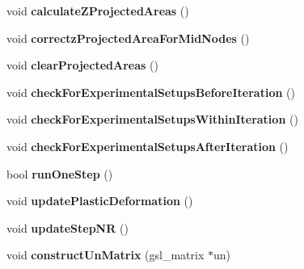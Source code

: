 \begin{DoxyCompactItemize}
\item 
\hypertarget{classSimulation_af21c5c157e6f487f879bdd7043288982}{}void {\bfseries calculate\+Z\+Projected\+Areas} ()\label{classSimulation_af21c5c157e6f487f879bdd7043288982}

\item 
\hypertarget{classSimulation_a7a47dfca0623a5636cb65416411cb901}{}void {\bfseries correctz\+Projected\+Area\+For\+Mid\+Nodes} ()\label{classSimulation_a7a47dfca0623a5636cb65416411cb901}

\item 
\hypertarget{classSimulation_a9c3f5acaa8ec130dedc94dfd6f7b013a}{}void {\bfseries clear\+Projected\+Areas} ()\label{classSimulation_a9c3f5acaa8ec130dedc94dfd6f7b013a}

\item 
\hypertarget{classSimulation_aa9ad0627365ad5d465b273183c7db344}{}void {\bfseries check\+For\+Experimental\+Setups\+Before\+Iteration} ()\label{classSimulation_aa9ad0627365ad5d465b273183c7db344}

\item 
\hypertarget{classSimulation_a2ebd37d36e25d118738d25811da4aa45}{}void {\bfseries check\+For\+Experimental\+Setups\+Within\+Iteration} ()\label{classSimulation_a2ebd37d36e25d118738d25811da4aa45}

\item 
\hypertarget{classSimulation_ae8b5dcc56bb2633d284a413f1e9dc1e9}{}void {\bfseries check\+For\+Experimental\+Setups\+After\+Iteration} ()\label{classSimulation_ae8b5dcc56bb2633d284a413f1e9dc1e9}

\item 
\hypertarget{classSimulation_a300713fd91c15b51421606bffd6d87b7}{}bool {\bfseries run\+One\+Step} ()\label{classSimulation_a300713fd91c15b51421606bffd6d87b7}

\item 
\hypertarget{classSimulation_aba920b0ae2806ea3890cbe2b819977fe}{}void {\bfseries update\+Plastic\+Deformation} ()\label{classSimulation_aba920b0ae2806ea3890cbe2b819977fe}

\item 
\hypertarget{classSimulation_a6a869cb433953d1d36249460b0a74545}{}void {\bfseries update\+Step\+N\+R} ()\label{classSimulation_a6a869cb433953d1d36249460b0a74545}

\item 
\hypertarget{classSimulation_ac4afa7d6aa64384e78401aec62dd2270}{}void {\bfseries construct\+Un\+Matrix} (gsl\+\_\+matrix $\ast$un)\label{classSimulation_ac4afa7d6aa64384e78401aec62dd2270}


\end{DoxyCompactItemize}
